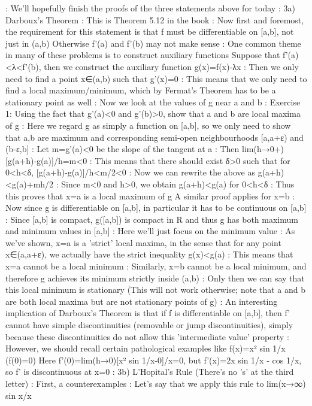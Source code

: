 :
We'll hopefully finish the proofs of the three statements above for today
:
3a) Darboux's Theorem
:
This is Theorem 5.12 in the book
:
Now first and foremost, the requirement for this statement is that f must be differentiable on [a,b], not just in (a,b)
Otherwise f'(a) and f'(b) may not make sense
:
One common theme in many of these problems is to construct auxiliary functions
Suppose that f'(a)<λ<f'(b), then we construct the auxiliary function g(x)=f(x)-λx
:
Then we only need to find a point x∈(a,b) such that g'(x)=0
:
This means that we only need to find a local maximum/minimum, which by Fermat's Theorem has to be a stationary point as well
:
Now we look at the values of g near a and b
:
Exercise 1: Using the fact that g'(a)<0 and g'(b)>0, show that a and b are local maxima of g
:
Here we regard g as simply a function on [a,b], so we only need to show that a,b are maximum and corresponding semi-open neighbourhoods [a,a+ε) and (b-ε,b]
:
Let m=g'(a)<0 be the slope of the tangent at a
:
Then lim(h→0+)[g(a+h)-g(a)]/h=m<0
:
This means that there should exist δ>0 such that for 0<h<δ, [g(a+h)-g(a)]/h<m/2<0
:
Now we can rewrite the above as
g(a+h)<g(a)+mh/2
:
Since m<0 and h>0, we obtain
g(a+h)<g(a) for 0<h<δ
:
Thus this proves that x=a is a local maximum of g
A similar proof applies for x=b
:
Now since g is differentiable on [a,b], in particular it has to be continuous on [a,b]
:
Since [a,b] is compact, g([a,b]) is compact in R and thus g has both maximum and minimum values in [a,b]
:
Here we'll just focus on the minimum value
:
As we've shown, x=a is a 'strict' local maxima, in the sense that for any point x∈(a,a+ε), we actually have the strict inequality g(x)<g(a)
:
This means that x=a cannot be a local minimum
:
Similarly, x=b cannot be a local minimum, and therefore g achieves its minimum strictly inside (a,b)
:
Only then we can say that this local minimum is stationary
(This will not work otherwise; note that a and b are both local maxima but are not stationary points of g)
:
An interesting implication of Darboux's Theorem is that if f is differentiable on [a,b], then f' cannot have simple discontinuities (removable or jump discontinuities), simply because these discontinuities do not allow this 'intermediate value' property
:
However, we should recall certain pathological examples like f(x)=x² sin 1/x (f(0)=0)
Here f'(0)=lim(h→0)[x² sin 1/x-0]/x=0, but f'(x)=2x sin 1/x - cos 1/x, so f' is discontinuous at x=0
:
3b) L'Hopital's Rule (There's no 's' at the third letter)
:
First, a counterexamples
:
Let's say that we apply this rule to lim(x→∞) sin x/x
